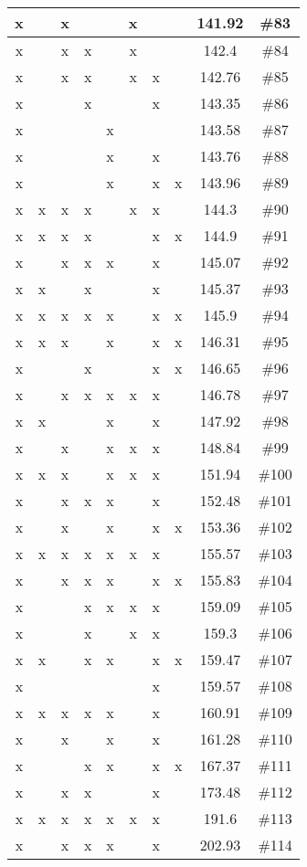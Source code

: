 \begin{center}
\begin{longtable}{|c|c|c|c|c|c|c|c|c|c|}
 x &  &  x &  &  &  x &  &  & 141.92 & \#83 \\ \hline
 x &  &  x &  x &  &  x &  &  & 142.4 & \#84 \\ \hline
 x &  &  x &  x &  &  x &  x &  & 142.76 & \#85 \\ \hline
 x &  &  &  x &  &  &  x &  & 143.35 & \#86 \\ \hline
 x &  &  &  &  x &  &  &  & 143.58 & \#87 \\ \hline
 x &  &  &  &  x &  &  x &  & 143.76 & \#88 \\ \hline
 x &  &  &  &  x &  &  x &  x & 143.96 & \#89 \\ \hline
 x &  x &  x &  x &  &  x &  x &  & 144.3 & \#90 \\ \hline
 x &  x &  x &  x &  &  &  x &  x & 144.9 & \#91 \\ \hline
 x &  &  x &  x &  x &  &  x &  & 145.07 & \#92 \\ \hline
 x &  x &  &  x &  &  &  x &  & 145.37 & \#93 \\ \hline
 x &  x &  x &  x &  x &  &  x &  x & 145.9 & \#94 \\ \hline
 x &  x &  x &  &  x &  &  x &  x & 146.31 & \#95 \\ \hline
 x &  &  &  x &  &  &  x &  x & 146.65 & \#96 \\ \hline
 x &  &  x &  x &  x &  x &  x &  & 146.78 & \#97 \\ \hline
 x &  x &  &  &  x &  &  x &  & 147.92 & \#98 \\ \hline
 x &  &  x &  &  x &  x &  x &  & 148.84 & \#99 \\ \hline
 x &  x &  x &  &  x &  x &  x &  & 151.94 & \#100 \\ \hline
 x &  &  x &  x &  x &  &  x &  & 152.48 & \#101 \\ \hline
 x &  &  x &  &  x &  &  x &  x & 153.36 & \#102 \\ \hline
 x &  x &  x &  x &  x &  x &  x &  & 155.57 & \#103 \\ \hline
 x &  &  x &  x &  x &  &  x &  x & 155.83 & \#104 \\ \hline
 x &  &  &  x &  x &  x &  x &  & 159.09 & \#105 \\ \hline
 x &  &  &  x &  &  x &  x &  & 159.3 & \#106 \\ \hline
 x &  x &  &  x &  x &  &  x &  x & 159.47 & \#107 \\ \hline
 x &  &  &  &  &  &  x &  & 159.57 & \#108 \\ \hline
 x &  x &  x &  x &  x &  &  x &  & 160.91 & \#109 \\ \hline
 x &  &  x &  &  x &  &  x &  & 161.28 & \#110 \\ \hline
 x &  &  &  x &  x &  &  x &  x & 167.37 & \#111 \\ \hline
 x &  &  x &  x &  &  &  x &  & 173.48 & \#112 \\ \hline
 x &  x &  x &  x &  x &  x &  x &  & 191.6 & \#113 \\ \hline
 x &  &  x &  x &  x &  &  x &  & 202.93 & \#114 \\ \hline
\end{longtable}
\end{center}

